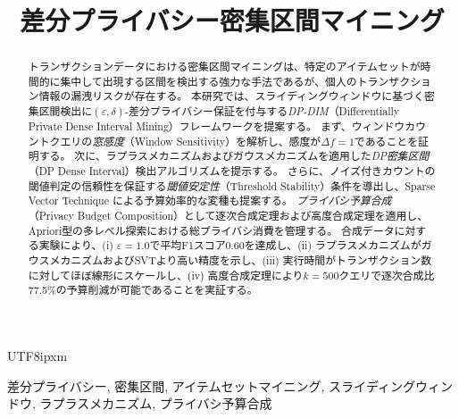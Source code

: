\documentclass[journal]{IEEEtran}
\begin{document}
\begin{CJK}{UTF8}{ipxm}

\title{差分プライバシー密集区間マイニング}

\author{
}

\maketitle

\begin{abstract}
トランザクションデータにおける密集区間マイニングは、特定のアイテムセットが時間的に集中して出現する区間を検出する強力な手法であるが、個人のトランザクション情報の漏洩リスクが存在する。
本研究では、スライディングウィンドウに基づく密集区間検出に$(\varepsilon, \delta)$-差分プライバシー保証を付与する\emph{DP-DIM}（Differentially Private Dense Interval Mining）フレームワークを提案する。
まず、ウィンドウカウントクエリの\emph{窓感度}（Window Sensitivity）を解析し、感度が$\Delta f = 1$であることを証明する。
次に、ラプラスメカニズムおよびガウスメカニズムを適用した\emph{DP密集区間}（DP Dense Interval）検出アルゴリズムを提示する。
さらに、ノイズ付きカウントの閾値判定の信頼性を保証する\emph{閾値安定性}（Threshold Stability）条件を導出し、Sparse Vector Technique による予算効率的な変種も提案する。
\emph{プライバシ予算合成}（Privacy Budget Composition）として逐次合成定理および高度合成定理を適用し、Apriori型の多レベル探索における総プライバシ消費を管理する。
合成データに対する実験により、(i) $\varepsilon = 1.0$で平均F1スコア0.60を達成し、(ii) ラプラスメカニズムがガウスメカニズムおよびSVTより高い精度を示し、(iii) 実行時間がトランザクション数に対してほぼ線形にスケールし、(iv) 高度合成定理により$k = 500$クエリで逐次合成比77.5\%の予算削減が可能であることを実証する。
\end{abstract}

\begin{IEEEkeywords}
差分プライバシー, 密集区間, アイテムセットマイニング, スライディングウィンドウ, ラプラスメカニズム, プライバシ予算合成
\end{IEEEkeywords}











\end{CJK}
\end{document}
